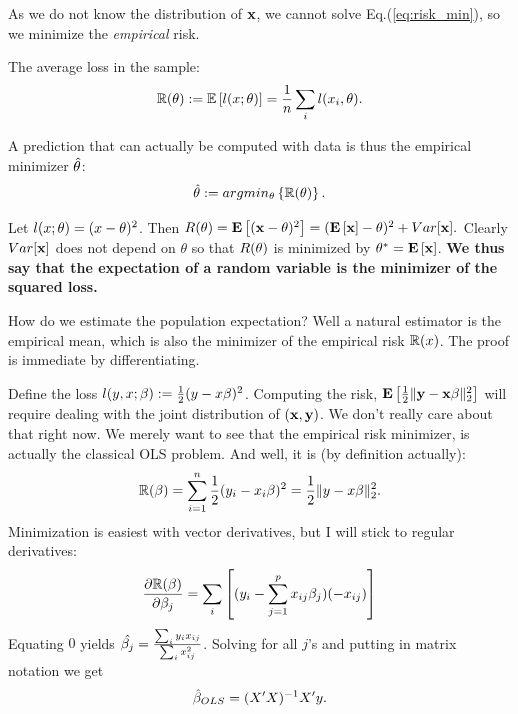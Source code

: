 As we do not know the distribution of $\mathbf{x}$, we cannot solve Eq.(\ref{eq:risk_min}), so we minimize the \emph{empirical} risk.
\begin{definition}
The average loss in the sample: 
\begin{align}
	\mathbb{R}(\theta):=\mathbb{E}\left[l(x;\theta)\right]=\frac{1}{n}\sum_i l(x_i,\theta).
\end{align}
\end{definition}

A prediction that can actually be computed with data is thus the empirical minimizer $\hat{\theta}$:
\begin{align}
\label{eq:empirical_risk_min}
 \hat{\theta}:= argmin_{\theta}\left\{ \mathbb{R}(\theta) \right\}.
\end{align}



\begin{example}
\label{eg:squared_loss}

Let $l(x;\theta)=(x-\theta)^2$. Then 
$
	R(\theta) = 
	\mathbf{E}\left[ (\mathbf{x}-\theta)^2 \right] = 
	(\mathbf{E}\left[ \mathbf{x} \right]-\theta)^2 + Var[\mathbf{x}]. 
$
Clearly  $Var[\mathbf{x}]$ does not depend on $\theta$  so that $R(\theta)$ is minimized by $\theta^*=\mathbf{E}\left[ \mathbf{x} \right]$.
\textbf{We thus say that the expectation of a random variable is the minimizer of the squared loss.}

How do we estimate the population expectation? Well a natural estimator is the empirical mean, which is also the minimizer of the empirical risk $\mathbb{R}(x)$. The proof is immediate by differentiating. 
\end{example}


\begin{example}
\label{eg:OLS}
Define the loss $l(y,x;\beta):=\frac{1}{2}(y-x\beta)^2$.
Computing the risk, $\mathbf{E}\left[ \frac{1}{2} \Vert \mathbf{y}-\mathbf{x}\beta \Vert_2^2 \right]$ will require dealing with the joint distribution of $(\mathbf{x},\mathbf{y})$.
We don't really care about that right now. 
We merely want to see that the empirical risk minimizer, is actually the classical OLS problem. 
And well, it is (by definition actually):
\begin{align*}
	\mathbb{R}(\beta)=\sum_{i=1}^n 	\frac{1}{2}(y_i-x_i\beta)^2 = \frac{1}{2}\Vert y-x\beta \Vert_2^2.
\end{align*}
Minimization is easiest with vector derivatives, but I will stick to regular derivatives:
\begin{align*}
	\frac{\partial \mathbb{R}(\beta)}{\partial {\beta_j}} = \sum_i \left[ (y_i-\sum_{j=1}^p x_{ij}\beta_j)(-x_{ij}) \right]
\end{align*}
Equating $0$ yields $\hat{\beta_j}=\frac{\sum_i y_i x_{ij}}{\sum_i x_{ij}^2}$.
Solving for all $j$'s and putting in matrix notation we get
\begin{align}
	\hat{\beta}_{OLS}=(X'X)^{-1} X'y.
\end{align}

\end{example}



